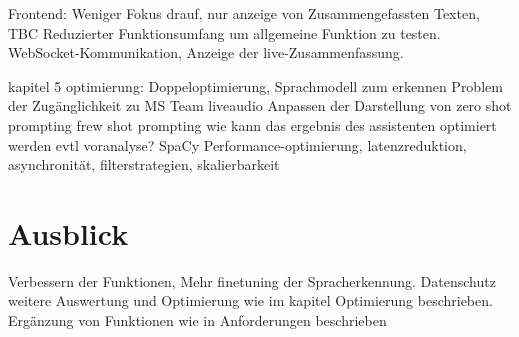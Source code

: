 Frontend: 
Weniger Fokus drauf, nur anzeige von Zusammengefassten Texten, TBC 
Reduzierter Funktionsumfang um allgemeine Funktion zu testen. WebSocket-Kommunikation, Anzeige der live-Zusammenfassung.

kapitel 5 
optimierung: 
Doppeloptimierung, Sprachmodell zum erkennen 
Problem der Zugänglichkeit zu MS Team liveaudio
Anpassen der Darstellung von 
zero shot prompting 
frew shot prompting 
wie kann das ergebnis des assistenten optimiert werden
evtl voranalyse? SpaCy
Performance-optimierung, latenzreduktion, asynchronität, filterstrategien, skalierbarkeit 

\section{Ausblick}
Verbessern der Funktionen, Mehr finetuning der Spracherkennung. 
Datenschutz weitere Auswertung und Optimierung wie im kapitel Optimierung beschrieben. 
Ergänzung von Funktionen wie in Anforderungen beschrieben